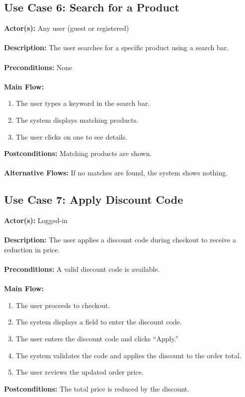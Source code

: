 \documentclass[a4paper,12pt]{article}
\begin{document}
	\subsection*{Use Case 6: Search for a Product}
	\textbf{Actor(s):} Any user (guest or registered) \\ \\
	\textbf{Description:} The user searches for a specific product using a search bar. \\ \\
	\textbf{Preconditions:} None \\ \\
	\textbf{Main Flow:}
	\begin{enumerate}
  		\item The user types a keyword in the search bar.
  		\item The system displays matching products.
  		\item The user clicks on one to see details.
	\end{enumerate}
	\textbf{Postconditions:} Matching products are shown. \\ \\
	\textbf{Alternative Flows:} If no matches are found, the system shows nothing.
	\subsection*{Use Case 7: Apply Discount Code}
	\textbf{Actor(s):} Logged-in \\ \\
	\textbf{Description:} The user applies a discount code during checkout to receive a \\ reduction in
	price. \\ \\
	\textbf{Preconditions:} A valid discount code is available. \\ \\
	\textbf{Main Flow:}
	\begin{enumerate}
  		\item The user proceeds to checkout.
  		\item The system displays a field to enter the discount code.
  		\item The user enters the discount code and clicks ``Apply.''
  		\item The system validates the code and applies the discount to the order total.
  		\item The user reviews the updated order price.
	\end{enumerate}
	\textbf{Postconditions:} The total price is reduced by the discount.
\end{document}
